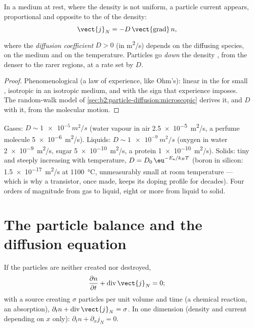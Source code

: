\begin{theorem}\label{thm:b2:particle-diffusion:fick}
In a medium at rest, where the density is not uniform, a particle
current appears, proportional and opposite to the  of the
density:
\[
\vect{j}_N = -D\,\vect{\operatorname{grad}}\,n ,
\]
where the \emph{diffusion coefficient}
$D > 0$ (in \unit{m^2/s}) depends on the diffusing species, on the
medium and on the temperature. Particles go \emph{down} the density
, from the denser to the rarer regions, at a rate set by $D$.
\end{theorem}

\begin{proof}
Phenomenological (a law of experience, like Ohm's): linear in the
 for small , isotropic in an isotropic medium, and
with the sign that experience imposes. The random-walk model of
\cref{sec:b2:particle-diffusion:microscopic} derives it, and $D$ with it,
from the molecular motion.
\end{proof}

\begin{example}\label{ex:b2:particle-diffusion:orders}
Gases: $D \sim \qty{1e-5}{m^2/s}$ (water vapour in air
\qty{2.5e-5}{m^2/s}, a perfume molecule \qty{5e-6}{m^2/s}). Liquids:
$D \sim \qty{1e-9}{m^2/s}$ (oxygen in water \qty{2e-9}{m^2/s}, sugar
\qty{5e-10}{m^2/s}, a protein \qty{1e-10}{m^2/s}). Solids: tiny and
steeply increasing with temperature, $D = D_0\,\eu^{-E_{\text{a}}/k_BT}$
(boron in silicon: \qty{1.5e-17}{m^2/s} at \qty{1100}{\celsius},
unmeasurably small at room temperature --- which is why a transistor,
once made, keeps its doping profile for decades). Four orders of
magnitude from gas to liquid, eight or more from liquid to solid.
\end{example}

\section{The particle balance and the diffusion equation}

\begin{theorem}\label{thm:b2:particle-diffusion:balance}
If the particles are neither created nor destroyed,
\[
\frac{\partial n}{\partial t} + \operatorname{div}\vect{j}_N = 0 ;
\]
with a source creating $\sigma$ particles per unit volume and time
(a chemical reaction, an absorption), $\partial_t n +
\operatorname{div}\vect{j}_N = \sigma$. In one dimension (density and
current depending on $x$ only): $\partial_t n + \partial_x j_N = 0$.
\end{theorem}

